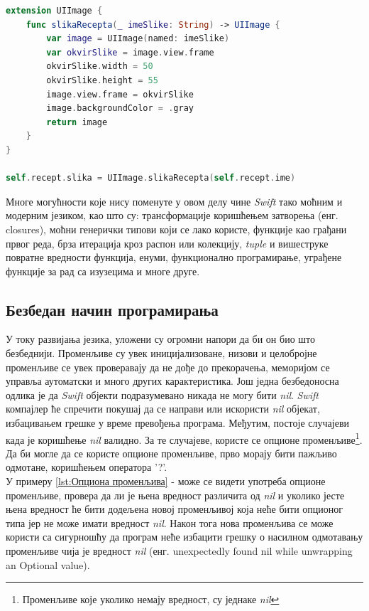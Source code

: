 \documentclass[12pt,oneside]{memoir}
\begin{document}
\begin{lstlisting}[caption=\textit{{Надоградња Swift класе}}, label={lst:Надоградња Swift класе}, language=Swift, frame=single]
extension UIImage {
    func slikaRecepta(_ imeSlike: String) -> UIImage {
        var image = UIImage(named: imeSlike)
        var okvirSlike = image.view.frame
        okvirSlike.width = 50
        okvirSlike.height = 55
        image.view.frame = okvirSlike
        image.backgroundColor = .gray
        return image
    }
}

self.recept.slika = UIImage.slikaRecepta(self.recept.ime)

\end{lstlisting}

\indent Многе могућности које нису поменуте у овом делу чине \textit{Swift} тако моћним и модерним језиком, као што су: трансформације коришћењем затворења (енг. closures), моћни генерички типови који се лако користе, функције као грађани првог реда, брза итерација кроз распон или колекцију, \textit{tuple} и вишеструке повратне вредности функција, енуми, функционално програмирање, уграђене функције за рад са изузецима и многе друге.

\subsection{Безбедан начин програмирања}

\indent У току развијања језика, уложени су огромни напори да би он био што безбеднији. Променљиве су увек иницијализоване, низови и целобројне променљиве се увек проверавају да не дође до прекорачења, меморијом се управља аутоматски и много других карактеристика.
Још једна безбедоносна одлика је да \textit{Swift} објекти подразумевано никада не могу бити \textit{nil}. \textit{Swift} компајлер ће спречити покушај да се направи или искористи \textit{nil} објекат, избацивањем грешке у време превођења програма.
Међутим, постоје случајеви када је коришћење \textit{nil} валидно. За те случајеве, користе се опционе променљиве\footnote{Променљиве које уколико немају вредност, су једнаке \textit{nil}}. Да би могле да се користе опционе променљиве, прво морају бити пажљиво одмотане, коришћењем оператора '?'.
\\
\indent У примеру \ref{lst:Опциона променљива} -  може се видети употреба опционе променљиве, провера да ли је њена вредност различита од \textit{nil} и уколико јесте њена вредност ће бити додељена новој променљивој која неће бити опционог типа јер не може имати вредност \textit{nil}. Након тога нова променљива се може користи са сигурношћу да програм неће избацити грешку о насилном одмотавању променљиве чија је вредност \textit{nil} (енг. unexpectedly found nil while unwrapping an Optional value).
\end{document}
